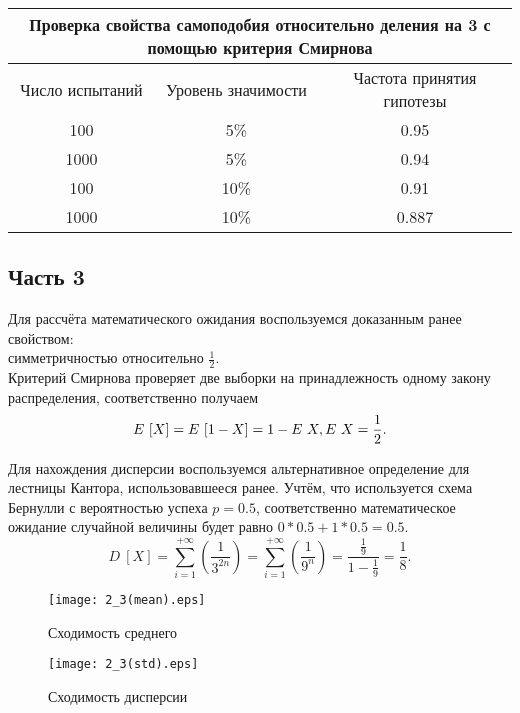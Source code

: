 \documentclass[11pt]{article}
\begin{document}
\begin{tabular}{|c|c|c|}
\hline
\multicolumn{3}{|c|}{Проверка свойства самоподобия относительно деления на 3 с помощью критерия Смирнова} \\
\hline
Число испытаний & Уровень значимости & Частота принятия гипотезы \\
\hline
100 & 5\% & 0.95 \\
1000 & 5\% & 0.94 \\
100 & 10\% & 0.91 \\
1000 & 10\% & 0.887 \\
\hline
\end{tabular}


\subsection{Часть 3}
Для рассчёта математического ожидания воспользуемся доказанным ранее свойством: \\
симметричностью относительно $\frac{1}{2}$. \\
Критерий Смирнова проверяет две выборки на принадлежность одному закону распределения, соответственно получаем
$$
    E~[X] = E~[1 - X] = 1 - E~X, \\
    E~X = \frac{1}{2}.
$$

Для нахождения дисперсии воспользуемся альтернативное определение для лестницы Кантора, использовавшееся ранее. Учтём, что используется схема Бернулли с вероятностью успеха $p=0.5$, соответственно математическое ожидание случайной величины будет равно $0 * 0.5 + 1 * 0.5 = 0.5$.
$$
    D~[X] = \sum_{i=1}^{+\infty} (\frac{1}{3^{2n}}) =  \sum_{i=1}^{+\infty} (\frac{1}{9^{n}}) = \frac{\frac{1}{9}}{1 - \frac{1}{9}} = \frac{1}{8}.
$$

\begin{figure}[ht]

    \texttt{[image: 2\_3(mean).eps]} 
    \caption{Сходимость среднего}
\end{figure}  


\begin{figure}[ht]

    \texttt{[image: 2\_3(std).eps]} 
    \caption{Сходимость дисперсии}
\end{figure} 

\FloatBarrier
\end{document}
